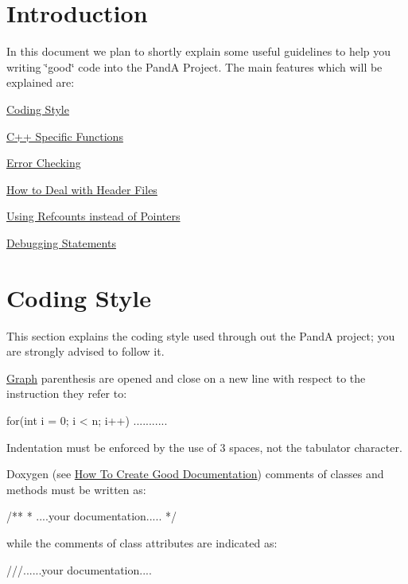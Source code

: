 \hypertarget{programming_style_programming_intro}{}\section{Introduction}\label{programming_style_programming_intro}
In this document we plan to shortly explain some useful guidelines to help you writing \char`\"{}good\char`\"{} code into the PandA Project. The main features which will be explained are\+:
\begin{DoxyItemize}
\item \hyperlink{programming_style_prog_style}{Coding Style}
\item \hyperlink{programming_style_special_function}{C++ Specific Functions}
\item \hyperlink{programming_style_check_errors}{Error Checking}
\item \hyperlink{programming_style_header_including}{How to Deal with Header Files}
\item \hyperlink{programming_style_refcounts_how_to}{Using Refcounts instead of Pointers}
\item \hyperlink{programming_style_debugging_statements}{Debugging Statements}
\end{DoxyItemize}\hypertarget{programming_style_prog_style}{}\section{Coding Style}\label{programming_style_prog_style}
This section explains the coding style used through out the PandA project; you are strongly advised to follow it.
\begin{DoxyItemize}
\item \hyperlink{structGraph}{Graph} parenthesis are opened and close on a new line with respect to the instruction they refer to\+: \begin{DoxyVerb}for(int i = 0; i < n; i++)
{
   ...........
}
\end{DoxyVerb}

\item Indentation must be enforced by the use of 3 spaces, not the tabulator character.
\item Doxygen (see \hyperlink{documentation_how_to}{How To Create Good Documentation}) comments of classes and methods must be written as\+: \begin{DoxyVerb}/**
 * ....your documentation.....
 */
\end{DoxyVerb}
 while the comments of class attributes are indicated as\+: \begin{DoxyVerb}///......your documentation....
\end{DoxyVerb}

\end{DoxyItemize}

